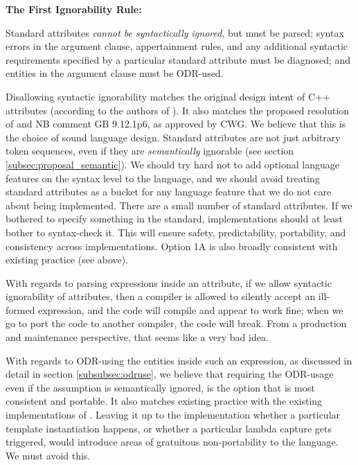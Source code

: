 \begin{adjustwidth}{0.5cm}{0.5cm}
\textbf{The First Ignorability Rule:}

Standard attributes \emph{cannot be syntactically ignored}, but must be parsed; syntax errors in the argument clause, appertainment rules, and any additional syntactic requirements specified by a particular standard attribute must be diagnosed; and entities in the argument clause must be ODR-used.
\end{adjustwidth}

 Disallowing syntactic ignorability matches the original design intent of C++ attributes (according to the authors of \cite{N2761}). It also matches the proposed resolution of \cite{CWG2538} and NB comment GB 9.12.1p6, as approved by CWG. We believe that this is the choice of sound language design. Standard attributes are not just arbitrary token sequences, even if they are \emph{semantically} ignorable (see section \ref{subsec:proposal_semantic}). We should try hard not to add optional language features on the syntax level to the language, and we should avoid treating standard attributes as a bucket for any language feature that we do not care about being implemented. There are a small number of standard attributes. If we bothered to specify something in the standard, implementations should at least bother to syntax-check it. This will ensure safety, predictability, portability, and consistency across implementations. Option 1A is also broadly consistent with existing practice (see above).

With regards to parsing expressions inside an attribute, if we allow syntactic ignorability of attributes, then a compiler is allowed to silently accept an ill-formed expression, and the code will compile and appear to work fine; when we go to port the code to another compiler, the code will break. From a production and maintenance perspective, that seems like a very bad idea. 
 
With regards to ODR-using the entities inside such an expression, as discussed in detail in section \ref{subsubsec:odruse}, we believe that requiring the ODR-usage even if the assumption is semantically ignored, is the option that is most consistent and portable. It also matches existing practice with the existing implementations of . Leaving it up to the implementation whether a particular template instantiation happens, or whether a particular lambda capture gets triggered, would introduce areas of gratuitous non-portability to the language. We must avoid this. 

